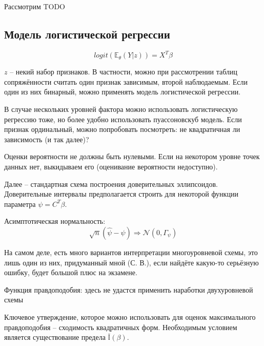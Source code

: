 \documentclass[main.tex]{subfiles}
\begin{document}
Рассмотрим TODO

\subsection{Модель логистической регрессии}

\[ logit(\mathds E_\theta (Y|z)) = X^T \beta \]

$ z $ -- некий набор признаков.
В частности, можно при рассмотрении таблиц сопряжённости считать один признак зависимым, второй наблюдаемым.
Если один из них бинарный, можно применять модель логистической регрессии.

В случае нескольких уровней фактора можно использовать логистическую регрессию тоже, но более удобно использовать пуассоновскуб модель.
Если признак ординальный, можно попробовать посмотреть: не квадратичная ли зависимость (и так далее)?


Оценки вероятности не должны быть нулевыми.
Если на некотором уровне точек данных нет, выкидываем его (оценивание вероятности недоступно).

Далее -- стандартная схема построения доверительных эллипсоидов.
Доверительные интервалы предполагается строить для некоторой функции параметра $ \psi = C^T \beta $.

Асимптотическая нормальность:
\[ \sqrt n \left( \hat \psi - \psi \right) \Rightarrow \mathcal N (0, \Gamma_\psi)  \]


\begin{leftbar}
На самом деле, есть много вариантов интерпретации многоуровневой схемы, это лишь один из них, придуманный мной (С. В.), если найдёте какую-то серьёзную ошибку, будет большой плюс на экзамене.
\end{leftbar}

Функция правдоподобия: здесь не удастся применить наработки двухуровневой схемы


Ключевое утверждение, которое можно использовать для оценок максимального правдоподобия -- сходимость квадратичных форм.
Необходимым условием является существование предела $ \bar{ \mathds I }(\beta) $.
\end{document}
